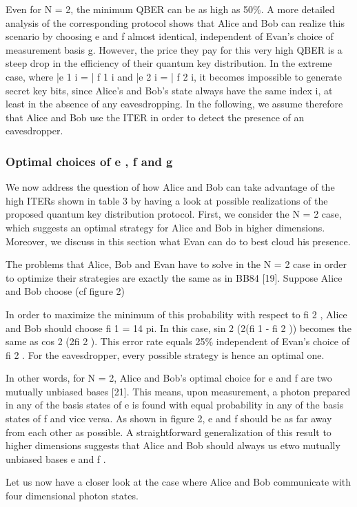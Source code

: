 Even for N = 2, the minimum QBER can be as high as 50\%. A more detailed analysis of the corresponding protocol shows that Alice and Bob can realize this scenario by choosing e and f almost identical, independent of Evan’s choice of measurement basis g. However, the price they pay for this very high QBER is a steep drop in the efficiency of their quantum key distribution. In the extreme case, where |e 1 i = | f 1 i and |e 2 i = | f 2 i, it becomes impossible to generate secret key bits, since Alice’s and Bob’s state always have the same index i, at least in the absence of any eavesdropping. In the following, we assume therefore that Alice and Bob use the ITER in order to detect the presence of an eavesdropper.

\subsubsection{Optimal choices of e , f and g}

We now address the question of how Alice and Bob can take advantage of the high ITERs shown in table 3 by having a look at possible realizations of the proposed quantum key distribution protocol. First, we consider the N = 2 case, which suggests an optimal strategy for Alice and Bob in higher dimensions. Moreover, we discuss in this section what Evan can do to best cloud his presence.

The problems that Alice, Bob and Evan have to solve in the N = 2 case in order to optimize their strategies are exactly the same as in BB84 [19]. Suppose Alice and Bob choose (cf figure 2)

In order to maximize the minimum of this probability with respect to fi 2 , Alice and Bob should choose fi 1 = 14 pi. In this case, sin 2 (2(fi 1 - fi 2 )) becomes the same as cos 2 (2fi 2 ). This error rate equals 25\% independent of Evan’s choice of fi 2 . For the eavesdropper, every possible strategy is hence an optimal one.

In other words, for N = 2, Alice and Bob’s optimal choice for e and f are two mutually unbiased bases [21]. This means, upon measurement, a photon prepared in any of the basis states of e is found with equal probability in any of the basis states of f and vice versa. As shown in figure 2, e and f should be as far away from each other as possible. A straightforward generalization of this result to higher dimensions suggests that Alice and Bob should always us etwo mutually unbiased bases e and f .

Let us now have a closer look at the case where Alice and Bob communicate with four dimensional photon states. 

